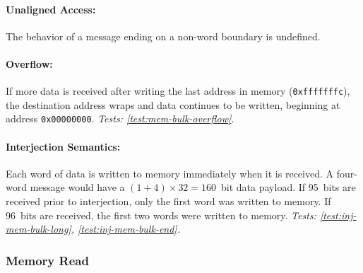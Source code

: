 \paragraph{Unaligned Access:} The behavior of a message ending on a
non-word boundary is undefined.

\paragraph{Overflow:} If more data is received after writing the last
address in memory ({\tt 0xfffffffc}), the destination address wraps and data
continues to be written, beginning at address {\tt 0x00000000}.
{\em Tests: \ref{test:mem-bulk-overflow}.}

\paragraph{Interjection Semantics:} Each word of data is written to memory
immediately when it is received. A four-word message would have a
$(1+4)\times32=160$~bit data payload. If 95~bits are received prior to
interjection, only the first word was written to memory. If 96~bits are
received, the first two words were written to memory.
{\em Tests: \ref{test:inj-mem-bulk-long}, \ref{test:inj-mem-bulk-end}.}

\subsubsection{Memory Read}
\label{cmd:mem-read}

